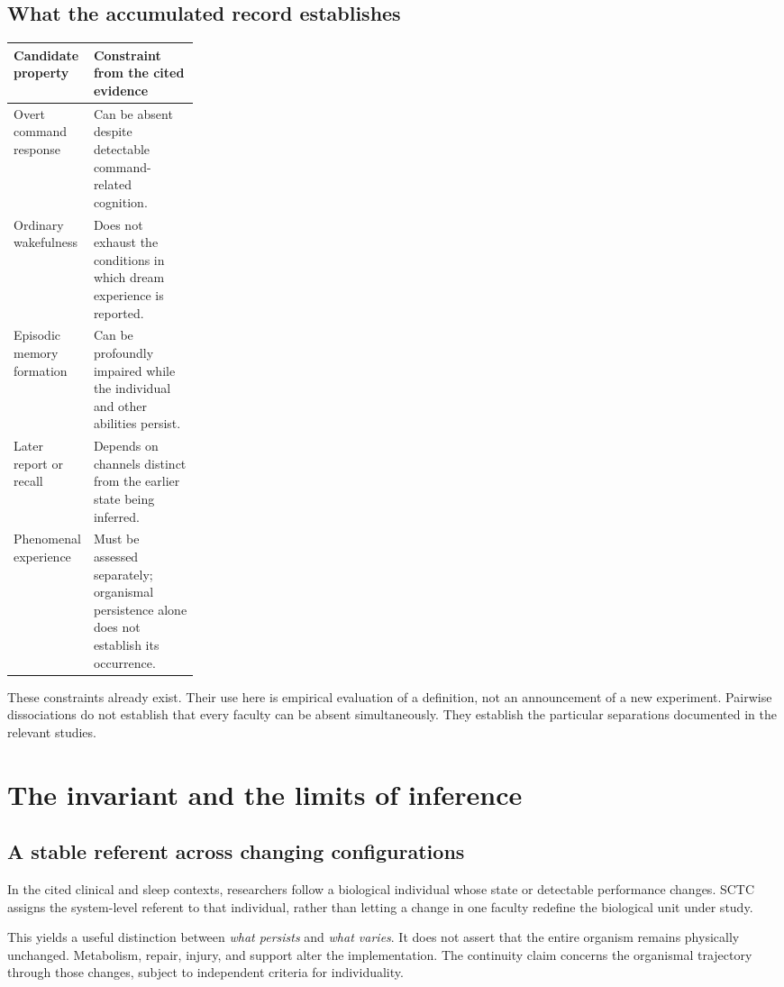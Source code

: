\documentclass[11pt,letterpaper]{article}
\begin{document}
\subsection*{What the accumulated record establishes}
\begin{center}
\small
\renewcommand{\arraystretch}{1.2}
\begin{tabularx}{\linewidth}{@{}>{\raggedright\arraybackslash}p{0.24\linewidth} X@{}}
\toprule
\textbf{Candidate property} & \textbf{Constraint from the cited evidence}\\
\midrule
Overt command response & Can be absent despite detectable command-related cognition.\\
Ordinary wakefulness & Does not exhaust the conditions in which dream experience is reported.\\
Episodic memory formation & Can be profoundly impaired while the individual and other abilities persist.\\
Later report or recall & Depends on channels distinct from the earlier state being inferred.\\
Phenomenal experience & Must be assessed separately; organismal persistence alone does not establish its occurrence.\\
\bottomrule
\end{tabularx}
\end{center}
These constraints already exist. Their use here is empirical evaluation of a definition, not an announcement of a new experiment. Pairwise dissociations do not establish that every faculty can be absent simultaneously. They establish the particular separations documented in the relevant studies.

\section{The invariant and the limits of inference}
\subsection*{A stable referent across changing configurations}
In the cited clinical and sleep contexts, researchers follow a biological individual whose state or detectable performance changes. SCTC assigns the system-level referent to that individual, rather than letting a change in one faculty redefine the biological unit under study.

This yields a useful distinction between \emph{what persists} and \emph{what varies}. It does not assert that the entire organism remains physically unchanged. Metabolism, repair, injury, and support alter the implementation. The continuity claim concerns the organismal trajectory through those changes, subject to independent criteria for individuality.
\end{document}
